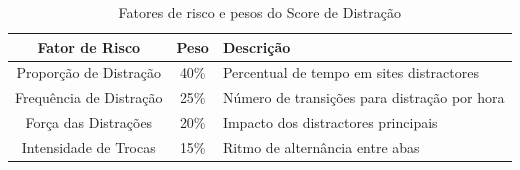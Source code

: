 \begin{table}[H]
    \centering
    \vspace{0.5cm}
    \begin{tabular}{|c|c|l|}
        \hline
        Fator de Risco & Peso & Descrição \\
        \hline
        Proporção de Distração & 40\% & Percentual de tempo em sites distractores\\
        Frequência de Distração & 25\% & Número de transições para distração por hora\\
        Força das Distrações & 20\% & Impacto dos distractores principais\\
        Intensidade de Trocas & 15\% & Ritmo de alternância entre abas\\
        \hline
    \end{tabular}
    \caption{Fatores de risco e pesos do Score de Distração}
    \label{tab:distraction_risk_components}
\end{table}